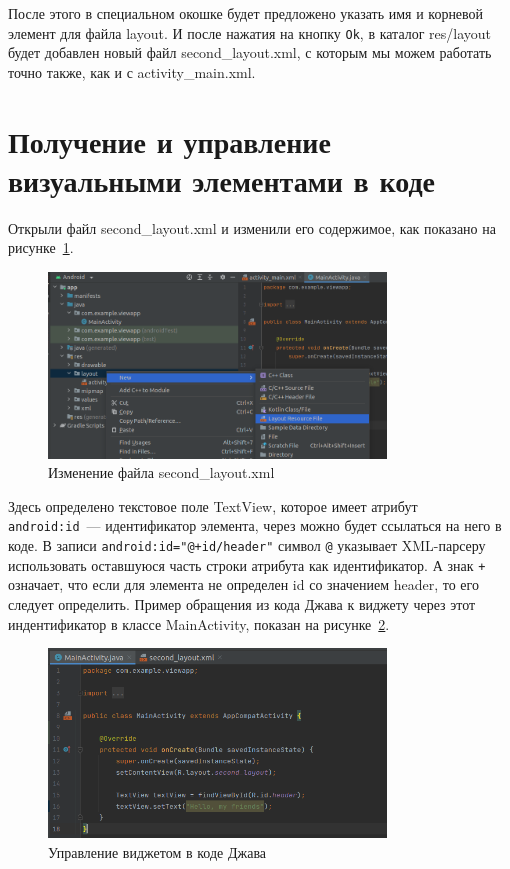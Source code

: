 После этого в специальном окошке будет предложено указать имя и
корневой элемент для файла layout. И после нажатия на кнопку \texttt{Ok},
в каталог res/layout будет добавлен новый файл second\_layout.xml,
с которым мы можем работать точно также, как и с activity\_main.xml.\par

\section{Получение и управление визуальными элементами в коде}
Открыли файл second\_layout.xml и изменили его содержимое, как показано
на рисунке~\ref{fig:xml:textview:d}.

\begin{figure}[h!tp]
	\centering
	\includegraphics[width=0.8\textwidth]{Screenshot from 2023-03-10 11-25-24.png}
	\caption{Изменение файла second\_layout.xml}
	\label{fig:xml:textview:d}
\end{figure}

Здесь определено текстовое поле TextView, которое имеет
атрибут \texttt{android:id}~--- идентификатор элемента,
через можно будет ссылаться на него в коде.
В записи \texttt{android:id="@+id/header"} символ
\texttt{@} указывает XML-парсеру использовать оставшуюся часть строки
атрибута как идентификатор. А знак \texttt{+} означает, что если для
элемента не определен id со значением header, то его следует
определить.
Пример обращения из кода Джава к виджету через этот индентификатор в
классе MainActivity, показан на рисунке~\ref{fig:java:textview:manage}.

\begin{figure}[h!tp]
	\centering
	\includegraphics[width=0.8\textwidth]{Screenshot from 2023-03-10 11-49-06.png}
	\caption{Управление виджетом в коде Джава}
	\label{fig:java:textview:manage}
\end{figure}

